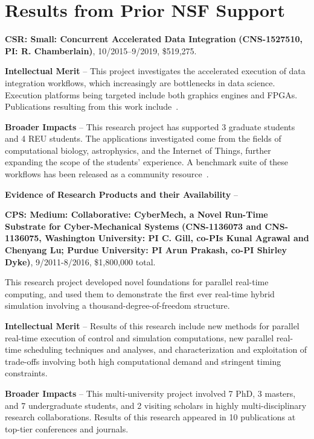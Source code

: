 \section{Results from Prior NSF Support}
\label{sec:prior}

\noindent
{\large\bf CSR: Small: Concurrent Accelerated Data Integration}
{\bf (CNS-1527510,
PI: R. Chamberlain)}, 
10/2015--9/2019, \$519,275.  

\textbf{Intellectual Merit} -- This project investigates the
accelerated execution of data integration workflows, which
increasingly are bottlenecks in data science. Execution platforms
being targeted include both graphics engines and FPGAs.  Publications
resulting from this work include~\cite{dibs,c17,mgc16,js16}.

\textbf{Broader Impacts} -- This research project has supported 3
graduate students and 4 REU students.  The applications investigated
come from the fields of computational biology, astrophysics, and the
Internet of Things, further expanding the scope of the students'
experience.  A benchmark suite of these workflows has been released
as a community resource~\cite{dibsv1}.

\textbf{Evidence of Research Products and their Availability} --

\noindent
{\large\bf CPS: Medium: Collaborative: CyberMech, a Novel Run-Time Substrate for 
Cyber-Mechanical Systems}
{\bf (CNS-1136073 and CNS-1136075,
Washington University: PI C. Gill, co-PIs Kunal Agrawal and Chenyang Lu; Purdue University: PI Arun Prakash, co-PI Shirley Dyke)}, 9/2011-8/2016, \$1,800,000 total.  

This research project developed novel foundations for parallel real-time computing, and used them to demonstrate the first ever real-time hybrid simulation involving a thousand-degree-of-freedom structure.

\textbf{Intellectual Merit} -- Results of this research include new methods for parallel real-time execution of control and simulation computations, new parallel real-time scheduling techniques and analyses, and characterization and exploitation of trade-offs involving both high computational demand and stringent timing constraints.

\textbf{Broader Impacts} -- This multi-university project involved 7 PhD, 3 masters, and 7 undergraduate students, and 2 visiting scholars in highly multi-disciplinary research collaborations.  Results of this research appeared in 10 publications at top-tier conferences and journals.

